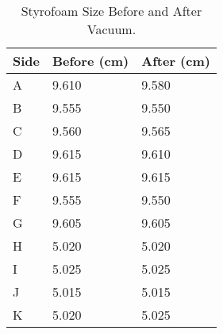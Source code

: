 \begin{table}[H]
\begin{tabular}{|l|l|l|}
\hline
Side & Before (cm) & After (cm) \\ \hline
A & 9.610 & 9.580 \\ \hline
B & 9.555 & 9.550 \\ \hline
C & 9.560 & 9.565 \\ \hline
D & 9.615 & 9.610 \\ \hline
E & 9.615 & 9.615 \\ \hline
F & 9.555 & 9.550 \\ \hline
G & 9.605 & 9.605 \\ \hline
H & 5.020 & 5.020 \\ \hline
I & 5.025 & 5.025 \\ \hline
J & 5.015 & 5.015 \\ \hline
K & 5.020 & 5.025 \\ \hline
\end{tabular}
\caption{Styrofoam Size Before and After Vacuum.}
\label{tab:styrofoam-test-result}
\end{table}